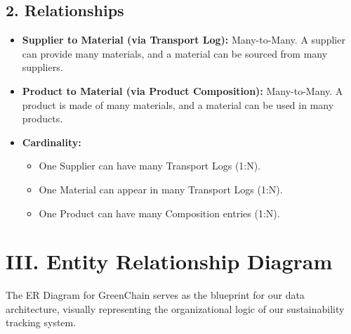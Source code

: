 \documentclass[12pt,a4paper]{article}
\begin{document}
\subsection*{2. Relationships}

\begin{itemize}
    \item \textbf{Supplier to Material (via Transport Log):} Many-to-Many. A supplier can provide many materials, and a material can be sourced from many suppliers.
    \item \textbf{Product to Material (via Product Composition):} Many-to-Many. A product is made of many materials, and a material can be used in many products.
    \item \textbf{Cardinality:}
    \begin{itemize}
        \item One Supplier can have many Transport Logs (1:N).
        \item One Material can appear in many Transport Logs (1:N).
        \item One Product can have many Composition entries (1:N).
    \end{itemize}
\end{itemize}

\newpage

\section*{III. Entity Relationship Diagram}

The ER Diagram for GreenChain serves as the blueprint for our data architecture, visually representing the organizational logic of our sustainability tracking system.
\end{document}
